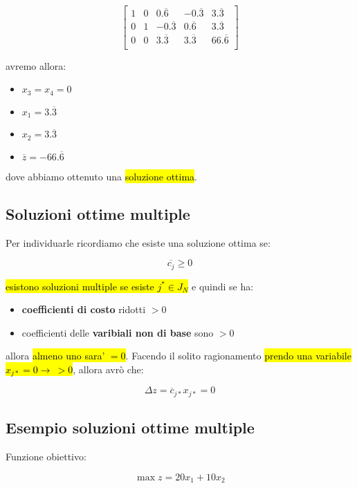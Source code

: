 $$
\left[ {\begin{array}{ccccc}
	1 & 0 & 0.\overline{6} & -0.\overline{3} & 3.\overline{3}\\
	0 & 1 & -0.\overline{3} & 0.\overline{6} & 3.\overline{3}\\
	0 & 0 & 3.\overline{3} & 3.\overline{3} & 66.\overline{6}\\
\end{array} } \right]
$$

avremo allora: 
\begin{itemize}
	\item $x_3 = x_4 = 0$
	\item $x_1 = 3.\overline{3}$
	\item $x_2 = 3.\overline{3}$
	\item $\overline{z} = -66.\overline{6}$
\end{itemize}

dove abbiamo ottenuto una \hl{soluzione ottima}.


\subsection{Soluzioni ottime multiple}

Per individuarle ricordiamo che esiste una soluzione ottima se: 

$$\overline{c_j} \geq 0$$

\hl{esistono soluzioni multiple se esiste $j^{*} \in J_N$} e quindi se ha:

\begin{itemize}
	\item \textbf{coefficienti di costo} ridotti $> 0$
	\item coefficienti delle \textbf{varibiali non di base} sono $> 0$
\end{itemize}

allora \hl{almeno uno sara' $= 0$}. Facendo il solito ragionamento \hl{prendo una variabile $x_{j*} = 0 \to\ > 0$}, allora avrò che:

$$\Delta z = \overline{c}_{j*} x_{j*} = 0$$


\subsection{Esempio soluzioni ottime multiple}

Funzione obiettivo:

$$\max z = 20x_1 + 10x_2$$

